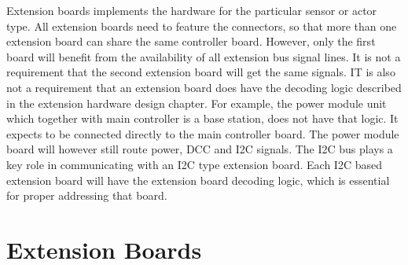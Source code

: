 Extension boards implements the hardware for the particular sensor or actor type. All extension boards need to feature the connectors, so that more than one extension board can share the same controller board. However, only the first board will benefit from the availability of all extension bus signal lines. It is not a requirement that the second extension board will get the same signals. IT is also not a requirement that an extension board does have the decoding logic described in the extension hardware design chapter. For example, the power module unit which together with main controller is a base station, does not have that logic. It expects to be connected directly to the main controller board. The power module board will however still route power, DCC and I2C signals. The I2C bus plays a key role in communicating with an I2C type extension board. Each I2C based extension board will have the extension board decoding logic, which is essential for proper addressing that board.


\section{Extension Boards}

